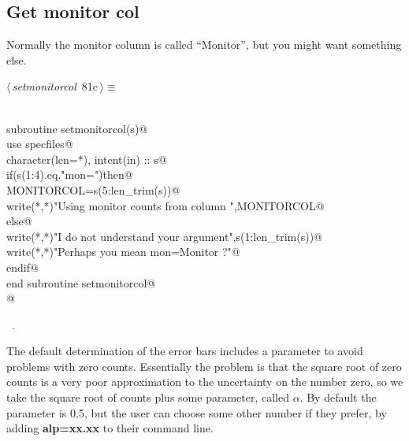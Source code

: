\documentclass[10pt,a4paper,notitlepage]{article}
\newcommand{\code}[1]{\textbf{\textsf{#1}}} %
\begin{document}
\subsection{Get monitor col}

Normally the monitor column is called ``Monitor'', but you might want something else.

\begin{flushleft} \small
\begin{minipage}{\linewidth}\label{scrap96}\raggedright\small
{} $\langle\,${\it setmonitorcol}\nobreak\ {\footnotesize {81c}}$\,\rangle\equiv$
\vspace{-1ex}
\begin{list}{}{} \item
\mbox{}\verb@@\\
\mbox{}\verb@      subroutine setmonitorcol(s)@\\
\mbox{}\verb@      use specfiles@\\
\mbox{}\verb@      character(len=*), intent(in) :: s@\\
\mbox{}\verb@      if(s(1:4).eq."mon=")then@\\
\mbox{}\verb@         MONITORCOL=s(5:len_trim(s))@\\
\mbox{}\verb@         write(*,*)"Using monitor counts from column ",MONITORCOL@\\
\mbox{}\verb@      else@\\
\mbox{}\verb@         write(*,*)"I do not understand your argument",s(1:len_trim(s))@\\
\mbox{}\verb@         write(*,*)"Perhaps you mean mon=Monitor ?"@\\
\mbox{}\verb@      endif@\\
\mbox{}\verb@      end subroutine setmonitorcol@\\
\mbox{}\verb@      @\\
\mbox{}\verb@@{\NWsep}
\end{list}
\vspace{-1.5ex}
\footnotesize
\begin{list}{}{\setlength{\itemsep}{-\parsep}\setlength{\itemindent}{-\leftmargin}}
\item \NWtxtMacroRefIn\ .

\item{}
\end{list}
\end{minipage}\vspace{4ex}
\end{flushleft}
The default determination of the error bars includes a parameter to avoid
problems with zero counts. Essentially the problem is that the square root
of zero counts is a very poor approximation to the uncertainty on the number
zero, so we take the square root of counts plus some parameter, called $\alpha$.
By default the parameter is 0.5, but the user can choose some other number
if they prefer, by adding \code{alp=xx.xx} to their command line. 
\end{document}

